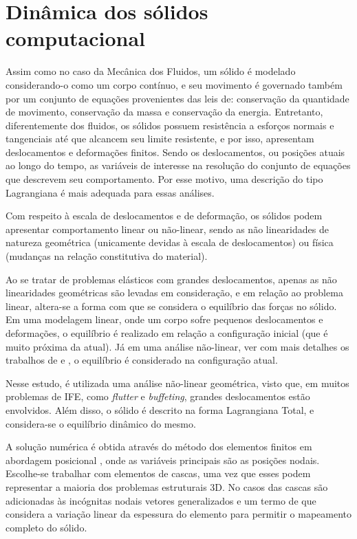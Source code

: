 \documentclass[tese_patricia]{subfiles}
\begin{document}
\chapter[Dinâmica dos sólidos computacional]{Dinâmica dos sólidos computacional} \label{capitulo:Cap3}

Assim como no caso da Mecânica dos Fluidos, um sólido é modelado considerando-o como um corpo contínuo, e seu movimento é governado também por um conjunto de equações provenientes das leis de: conservação da quantidade de movimento, conservação da massa e conservação da energia. Entretanto, diferentemente dos fluidos, os sólidos possuem resistência a esforços normais e tangenciais até que alcancem seu limite resistente, e por isso, apresentam deslocamentos e deformações finitos. Sendo os deslocamentos, ou posições atuais ao longo do tempo, as variáveis de interesse na resolução do conjunto de equações que descrevem seu comportamento. Por esse motivo, uma descrição do tipo Lagrangiana é mais adequada para essas análises.

Com respeito à escala de deslocamentos e de deformação, os sólidos podem apresentar comportamento linear ou não-linear, sendo as não linearidades de natureza geométrica (unicamente devidas à escala de deslocamentos) ou física (mudanças na relação constitutiva do material). 

Ao se tratar de problemas elásticos com grandes deslocamentos, apenas as não linearidades geométricas são levadas em consideração, e em relação ao problema linear, altera-se a forma com que se considera o equilíbrio das forças no sólido. Em uma modelagem linear, onde um corpo sofre pequenos deslocamentos e deformações, o equilíbrio é realizado em relação a configuração inicial (que é muito próxima da atual). Já em uma análise não-linear, ver com mais detalhes os trabalhos de  e , o equilíbrio é considerado na configuração atual.

Nesse estudo, é utilizada uma análise não-linear geométrica, visto que, em muitos problemas de IFE, como \textit{flutter} e \textit{buffeting}, grandes deslocamentos estão envolvidos. Além disso, o sólido é descrito na forma Lagrangiana Total, e considera-se o equilíbrio dinâmico do mesmo. 

A solução numérica é obtida através do método dos elementos finitos em abordagem posicional \cite{Coda:2003,Coda:2018}, onde as variáveis principais são as posições nodais. Escolhe-se trabalhar com elementos de cascas, uma vez que esses podem representar a maioria dos problemas estruturais 3D. No casos das cascas são adicionadas às incógnitas nodais vetores generalizados e um termo de que considera a variação linear da espessura do elemento para permitir o mapeamento completo do sólido. 
\end{document}
